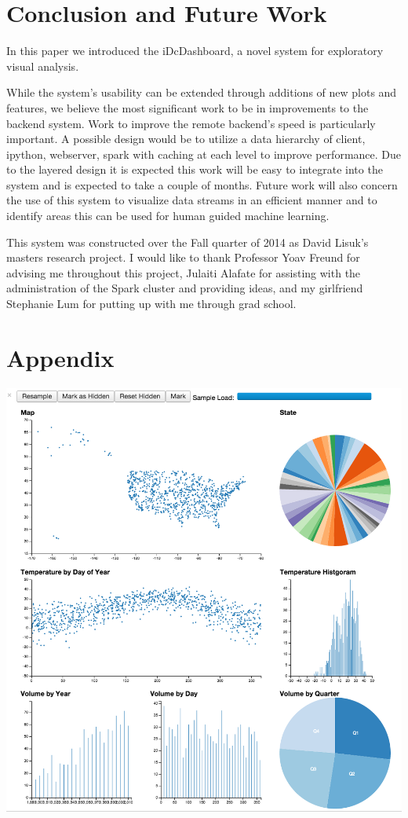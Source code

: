 \documentclass[letter,twocolumn]{article}
\begin{document}
\section{Conclusion and Future Work}\label{sec:conclusion}%

In this paper we introduced the iDcDashboard, a novel system for exploratory visual analysis.


While the system's usability can be extended through additions of new plots and features, we believe the most significant work to be in improvements to the backend system.
Work to improve the remote backend's speed is particularly important.
A possible design would be to utilize a data hierarchy of client, ipython, webserver, spark with caching at each level to improve performance.
Due to the layered design it is expected this work will be easy to integrate into the system and is expected to take a couple of months.
Future work will also concern the use of this system to visualize data streams in an efficient manner and to identify areas this can be used for human guided machine learning.

This system was constructed over the Fall quarter of 2014 as David Lisuk's masters research project.
I would like to thank Professor Yoav Freund for advising me throughout this project, Julaiti Alafate for assisting with the administration of the Spark cluster and providing ideas, and my girlfriend Stephanie Lum for putting up with me through grad school.


\onecolumn

\section{Appendix}
\centering
\includegraphics[width=6in]{figs/weather_dashboard.png}
\label{fig:weather}
\end{document}
